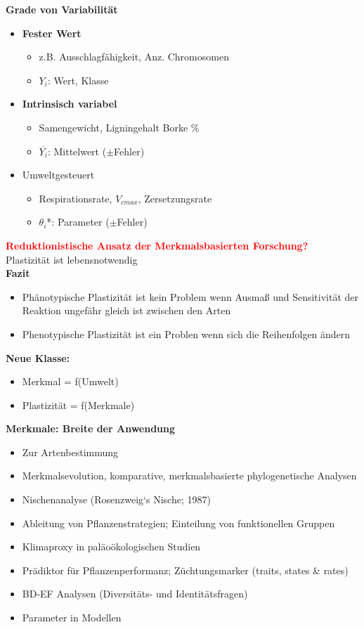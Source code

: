 \newpage
\textbf{Grade von Variabilität}
\begin{itemize}
	\item \textbf{Fester Wert}
	\begin{itemize}
		\item z.B. Ausschlagfähigkeit,  Anz. Chromosomen
		\item $Y_i$: Wert, Klasse
	\end{itemize}	
	\item \textbf{Intrinsisch variabel}
	\begin{itemize}
		\item Samengewicht, Ligningehalt Borke \%
		\item $\overline{Y_i}$: Mittelwert ($\pm$Fehler)
	\end{itemize}
	\item Umweltgesteuert
	\begin{itemize}
		\item Respirationsrate, $V_{cmax}$, Zersetzungsrate
		\item $\theta_i$*: Parameter ($\pm$Fehler)
	\end{itemize}
\end{itemize}

\textcolor{red}{\textbf{Reduktionistische Ansatz der Merkmalsbasierten Forschung?}}\\
Plastizität ist lebensnotwendig\\
\textbf{Fazit}
\begin{itemize}
	\item Phänotypische Plastizität ist kein Problem wenn Ausmaß und Sensitivität der Reaktion ungefähr gleich ist zwischen den Arten
	\item Phenotypische Plastizität ist ein Problen wenn sich die Reihenfolgen ändern
\end{itemize}

\textbf{Neue Klasse:}
\begin{itemize}
	\item Merkmal = f(Umwelt)
	\item Plastizität = f(Merkmale)
\end{itemize}

\textbf{Merkmale: Breite der Anwendung}
\begin{itemize}
	\item Zur Artenbestimmung
	\item Merkmalsevolution, komparative, merkmalsbasierte phylogenetische Analysen
	\item Nischenanalyse (Rosenzweig‘s Nische; 1987)
	\item Ableitung von Pflanzenstrategien; Einteilung von funktionellen Gruppen
	\item Klimaproxy in paläoökologischen Studien
	\item Prädiktor für Pflanzenperformanz; Züchtungsmarker (traits, states \& rates)
	\item BD-EF Analysen (Diversitäts- und Identitätsfragen)
	\item Parameter in Modellen
\end{itemize}

